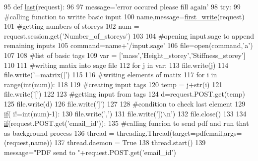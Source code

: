 \begin{DoxyCode}
95 \textcolor{keyword}{def }\hyperlink{namespacecivilsage_1_1views_aed47fb0740a2fa14693f697905788719}{last}(request):
96 
97     message=\textcolor{stringliteral}{'error occured please fill again'}
98     \textcolor{keywordflow}{try}:
99         \textcolor{comment}{#calling function to writte basic input}
100         name,message=\hyperlink{namespacecivilsage_1_1views_ad9397359f36a9df37e0aa43f3be032a3}{first\_write}(request)
101         \textcolor{comment}{#getting numbers of storeys}
102         num = request.session.get(\textcolor{stringliteral}{'Number\_of\_storeys'})
103 
104         \textcolor{comment}{#opening input.sage to append remaining inputs}
105         command=name+\textcolor{stringliteral}{'/input.sage'}
106         file=open(command,\textcolor{stringliteral}{'a'})
107 
108         \textcolor{comment}{#list of basic tags}
109         var = [\textcolor{stringliteral}{'mass'},\textcolor{stringliteral}{'Height\_storey'},\textcolor{stringliteral}{'Stiffness\_storey'}]
110 
111         \textcolor{comment}{#writing matix into sage file}
112         \textcolor{keywordflow}{for} j \textcolor{keywordflow}{in} var:
113             file.write(j)
114             file.write(\textcolor{stringliteral}{'=matrix(['})
115 
116             \textcolor{comment}{#writing elements of matix}
117             \textcolor{keywordflow}{for} i \textcolor{keywordflow}{in} range(int(num)):
118 
119                 \textcolor{comment}{#creating input tags}
120                 temp = j+str(i)
121                 file.write(\textcolor{stringliteral}{'['})
122 
123                 \textcolor{comment}{#getting input from tags}
124                 d=request.POST.get(temp)
125                 file.write(d)
126                 file.write(\textcolor{stringliteral}{']'})
127 
128                 \textcolor{comment}{#condition to check last element}
129                 \hyperlink{bootstrap_8min_8js_ac2d69f5011896c6ed4a54e0dd36f6334}{if}( i!=int(num)-1):
130                     file.write(\textcolor{stringliteral}{','})
131             file.write(\textcolor{stringliteral}{'])\(\backslash\)n'})
132         file.close()
133 
134         \hyperlink{bootstrap_8min_8js_ac2d69f5011896c6ed4a54e0dd36f6334}{if}(request.POST.get(\textcolor{stringliteral}{'email\_id'})):
135             \textcolor{comment}{#calling funcion to send pdf and run that as background process}
136             thread = threading.Thread(target=pdfemail,args=(request,name))
137             thread.daemon = \textcolor{keyword}{True}
138             thread.start()
139             message=\textcolor{stringliteral}{"PDF send to "}+request.POST.get(\textcolor{stringliteral}{'email\_id'})

\end{DoxyCode}
